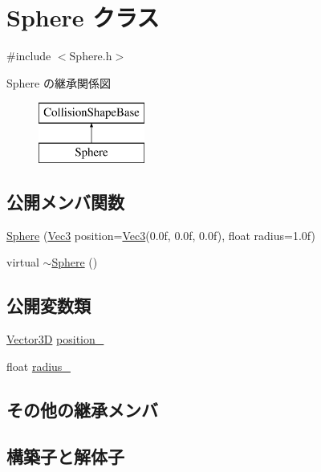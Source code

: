 \hypertarget{class_sphere}{}\section{Sphere クラス}
\label{class_sphere}


{\ttfamily \#include $<$Sphere.\+h$>$}

Sphere の継承関係図\begin{figure}[H]
\begin{center}
\leavevmode
\includegraphics[height=2.000000cm]{class_sphere}
\end{center}
\end{figure}
\subsection*{公開メンバ関数}
\begin{DoxyCompactItemize}
\item 
\mbox{\hyperlink{class_sphere_a00281a2ff42b3f2668fb853890447a73}{Sphere}} (\mbox{\hyperlink{_vector3_d_8h_ab16f59e4393f29a01ec8b9bbbabbe65d}{Vec3}} position=\mbox{\hyperlink{_vector3_d_8h_ab16f59e4393f29a01ec8b9bbbabbe65d}{Vec3}}(0.\+0f, 0.\+0f, 0.\+0f), float radius=1.\+0f)
\item 
virtual \mbox{\hyperlink{class_sphere_a569c071e50a3e11f678630ee1a17737e}{$\sim$\+Sphere}} ()
\end{DoxyCompactItemize}
\subsection*{公開変数類}
\begin{DoxyCompactItemize}
\item 
\mbox{\hyperlink{class_vector3_d}{Vector3D}} \mbox{\hyperlink{class_sphere_a5a18bfcc7abcdfbd6802ec622dfa5590}{position\+\_\+}}
\item 
float \mbox{\hyperlink{class_sphere_ac2924d9ad22bfad1ed1914c069c188dc}{radius\+\_\+}}
\end{DoxyCompactItemize}
\subsection*{その他の継承メンバ}


\subsection{構築子と解体子}
\mbox{\label{class_sphere_a00281a2ff42b3f2668fb853890447a73}} 
